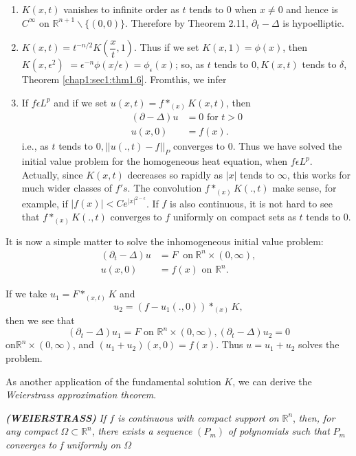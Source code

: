 \begin{enumerate}[(1)]
\item $K (x,t)$ vanishes to infinite order as $t$ tends to 0 when $x
  \neq 0$ and hence is $C^\infty$ on $\mathbb{R}^{n+1}\backslash \{ (0, 0)
  \}$. Therefore by Theorem 2.11, $\partial_t - \Delta $ is
  hypoelliptic. 
\item $K(x,t) = t^{-n/2} K \left(\dfrac{x}{t}, 1\right)$. Thus if we set $K(x,1)
  = \phi(x)$, then $K(x, \epsilon^2)$ $= \epsilon^{-n} \phi (x /
  \epsilon ) = \phi_\epsilon (x)$; so, as $t$ tends to
  $0,K(x,t)$ tends to $\delta$, Theorem
  \ref{chap1:sec1:thm1.6}. From\pageoriginale this, we infer  
\item If $f \epsilon L^p$ and if we set $u(x,t) = f *_{(x)}
  K(x,t)$, then  
  \begin{align*}
    (\partial - \Delta) u & = 0  \text { for } t > 0 \\
    u (x,0) & = f(x).
  \end{align*}
   i.e., as $t$ tends to $0, || u(.,t) - f ||_P$ converges to
   0. Thus we have solved the initial value problem for the
   homogeneous heat equation, when $f \epsilon L^p$. Actually,
   since $K(x,t)$ decreases so rapidly as $|x|$ tends to $\infty$,
   this works for much wider classes of $f's$. The convolution $f
   *_{(x)} K(., t)$ make sense, for example, if $|f(x)| < C
   e^{|x|^{2-\epsilon}}$. If $f$ is also continuous, it is not hard
   to see that $f *_{(x)} K(.,t)$ converges to $f$ uniformly on
   compact sets as $t$ tends to $0$. 
\end{enumerate}

It is now a simple matter to solve the inhomogeneous initial value problem:
\begin{align*}
(\partial_t - \Delta) u & = F  ~\text { on}~ \mathbb{R}^n \times (0, \infty),\\
u (x, 0) & = f(x) \text{ on } \mathbb{R}^n.
\end{align*}


If we take $u_1 = F *_{(x,t)} K$ and 
$$
u_2 = (f - u_1 (.,0)) *_{(x)} K,
$$
then we see that
$$
(\partial_t - \Delta) u_1 = F \text{ on } \mathbb{R}^n \times (0,
\infty), (\partial_t-\Delta) u_2 = 0 
$$
on\pageoriginale $\mathbb{R}^n \times (0, \infty)$, and $(u_1+u_2) (x,0) =
f(x)$. Thus $u = u_1 + u_2$ solves the problem. 

As another application of the fundamental solution $K$, we can derive
the \textit{Weierstrass approximation theorem}.  

\setcounter{thm}{34}
\begin{thm}\label{chap2:sec5:thm2.35}%
    \textbf{\em{(WEIERSTRASS)}} {\em If $f$ is continuous with compact
      support on } $\mathbb{R}^n$, {\em then, for any compact} $\Omega
    \subset \mathbb{R}^n$, {\em there exists a sequence} $(P_m)$ {\em
      of polynomials such that } $P_m$ {\em converges to f uniformly
      on }$\Omega$		 
\end{thm}

